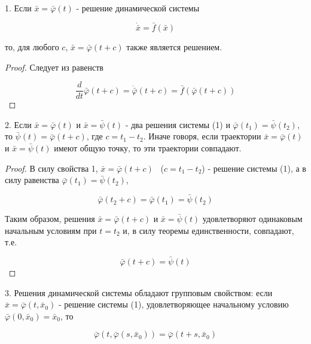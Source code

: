\documentclass{article}
\theoremstyle{definition} \newtheorem*{theorem*}{Теорема}
\theoremstyle{plain} \newtheorem{theorem}{Теорема}[section]
\theoremstyle{definition} \newtheorem*{corollary*}{Следствие}
\theoremstyle{definition} \newtheorem{corollary}{Следствие}[section]
\begin{document}
1. Если $ \bar{x} = \bar{\varphi}(t)$ -
решение динамической системы

\begin{equation}
    \dot{\bar{x}} = \bar{f}(\bar{x})
\end{equation}

то, для любого $c$, $\bar{x} = \bar{\varphi}(t + c)$
также является решением.
\begin{proof}
Следует из равенств

\begin{equation*}
    \frac{d}{dt} \bar{\varphi}(t + c)
    = \dot{\bar{\varphi}}(t + c)
    = \bar{f}(\bar{\varphi}(t + c))
\end{equation*}

\end{proof}

2. Если $\bar{x} = \bar{\varphi}(t)$ и $\bar{x} =
\bar{\psi}(t)$ - два решения системы (1) и
$\bar{\varphi}(t_1) = \bar{\psi}(t_2)$,
то $\bar{\psi}(t) = \bar{\varphi}(t + c)$,
где $c = t_1 - t_2$.
Иначе говоря, если траектории $\bar{x} = \bar{\varphi}(t)$ и
$\bar{x} = \bar{\psi}(t)$ имеют общую точку,
то эти траектории совпадают.

\begin{proof}
В силу свойства 1, $\bar{x} = \bar{\varphi}(t + c)$ \
($c = t_1 - t_2$) - решение системы (1),
а в силу равенства $\bar{\varphi}(t_1) = \bar{\psi}(t_2)$,

\begin{equation*}
    \bar{\varphi}(t_2 + c)
    = \bar{\varphi}(t_1)
    = \bar{\psi}(t_2)
\end{equation*}

Таким образом, решения $\bar{x} = \bar{\varphi}(t + c)$
и $\bar{x} = \bar{\psi}(t)$
удовлетворяют одинаковым начальным
условиям при $t = t_2$ и, в силу теоремы единственности,
совпадают, т.е.

\begin{equation*}
    \bar{\varphi}(t + c) = \bar{\psi}(t)
\end{equation*}

\end{proof}

3. Решения динамической системы обладают групповым свойством:
если $\bar{x} = \bar{\varphi}(t, \bar{x}_0)$ - решение
системы (1), удовлетворяющее начальному условию
$\bar{\varphi}(0, \bar{x}_0) =\bar{x}_0$, то

\begin{equation*}
    \bar{\varphi}(t, \bar{\varphi}(s, \bar{x}_0))
    = \bar{\varphi}(t + s, \bar{x}_0)
\end{equation*}
\end{document}

